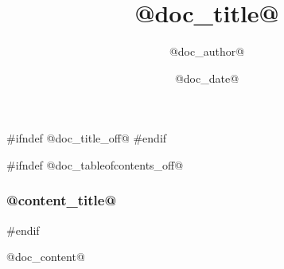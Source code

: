 \documentclass{beamer}
\title{@doc_title@}
\date{@doc_date@}
\author{@doc_author@}
\institute{@doc_company@}
\begin{document}
#ifndef @doc_title_off@
\frame[plain]{\titlepage}
#endif

#ifndef @doc_tableofcontents_off@
\begin{frame}
\frametitle{@content_title@}
\tableofcontents
\end{frame}
#endif

@doc_content@
\end{document}
